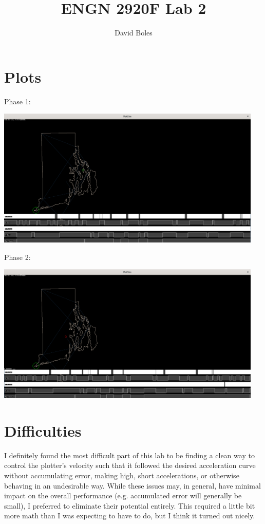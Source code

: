 \documentclass{article}
\title{ENGN 2920F Lab 2}
\author{David Boles}
\date{}
\begin{document}
\maketitle

\section*{Plots}
Phase 1:
\begin{center}
  \includegraphics[width=5in]{ri1.png}
\end{center}

Phase 2:

\begin{center}
  \includegraphics[width=5in]{ri2.png}
\end{center}

\section*{Difficulties}
I definitely found the most difficult part of this lab to be finding a clean way to control the plotter's velocity such that it followed the desired acceleration curve without accumulating error, making high, short accelerations, or otherwise behaving in an undesirable way. While these issues may, in general, have minimal impact on the overall performance (e.g. accumulated error will generally be small), I preferred to eliminate their potential entirely. This required a little bit more math than I was expecting to have to do, but I think it turned out nicely.
\end{document}
